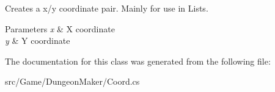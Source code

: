 Creates a x/y coordinate pair. Mainly for use in Lists. 


\begin{DoxyParams}{Parameters}
{\em x} & X coordinate\\
\hline
{\em y} & Y coordinate\\
\hline
\end{DoxyParams}


The documentation for this class was generated from the following file\+:\begin{DoxyCompactItemize}
\item 
src/\+Game/\+Dungeon\+Maker/Coord.\+cs\end{DoxyCompactItemize}
